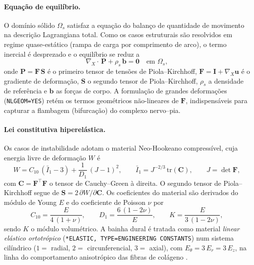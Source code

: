 \paragraph{Equação de equilíbrio.} O domínio sólido $\Omega_s$ satisfaz a
equação do balanço de quantidade de movimento na descrição Lagrangiana total.
Como os casos estruturais são resolvidos em regime quase-estático (rampa de
carga por comprimento de arco), o termo inercial é desprezado e o equilíbrio se
reduz a
\begin{equation}
  \nabla_{\!X}\!\cdot\,\mathbf{P} + \rho_s\,\mathbf{b} = \mathbf{0}
  \quad\text{em } \Omega_s,
  \label{eq:equilibrio-solido}
\end{equation}
onde $\mathbf{P} = \mathbf{F}\,\mathbf{S}$ é o primeiro tensor de tensões de
Piola--Kirchhoff, $\mathbf{F} = \mathbf{I} + \nabla_{\!X}\mathbf{u}$ é o
gradiente de deformação, $\mathbf{S}$ o segundo tensor de
Piola--Kirchhoff, $\rho_s$ a densidade de referência e $\mathbf{b}$ as forças de
corpo. A formulação de grandes deformações (\texttt{NLGEOM=YES}) retém os termos
geométricos não-lineares de $\mathbf{F}$, indispensáveis para capturar a
flambagem (bifurcação) do complexo nervo--pia.

\paragraph{Lei constitutiva hiperelástica.} Os casos de instabilidade adotam o
material Neo-Hookeano compressível, cuja energia livre de deformação $W$ é
\begin{equation}
  W = C_{10}\,(\bar I_1 - 3) + \frac{1}{D_1}\,(J-1)^2,
  \qquad
  \bar I_1 = J^{-2/3}\,\mathrm{tr}(\mathbf{C}),
  \qquad
  J = \det\mathbf{F},
  \label{eq:neohooke-W}
\end{equation}
com $\mathbf{C} = \mathbf{F}^{\!\top}\mathbf{F}$ o tensor de Cauchy--Green à
direita. O segundo tensor de Piola--Kirchhoff segue de
$\mathbf{S} = 2\,\partial W/\partial \mathbf{C}$. Os coeficientes do material são
derivados do módulo de Young $E$ e do coeficiente de Poisson $\nu$ por
\begin{equation}
  C_{10} = \frac{E}{4\,(1+\nu)},
  \qquad
  D_1 = \frac{6\,(1-2\nu)}{E},
  \qquad
  K = \frac{E}{3\,(1-2\nu)},
  \label{eq:neohooke-coef}
\end{equation}
sendo $K$ o módulo volumétrico. A bainha dural é tratada como material
\emph{linear elástico ortotrópico} (\texttt{*ELASTIC, TYPE=ENGINEERING
CONSTANTS}) num sistema cilíndrico ($1=$ radial, $2=$ circunferencial,
$3=$ axial), com $E_\theta = 3\,E_{r}=3\,E_{z}$, na linha do comportamento
anisotrópico das fibras de colágeno \citep{Holzapfel2000}.

